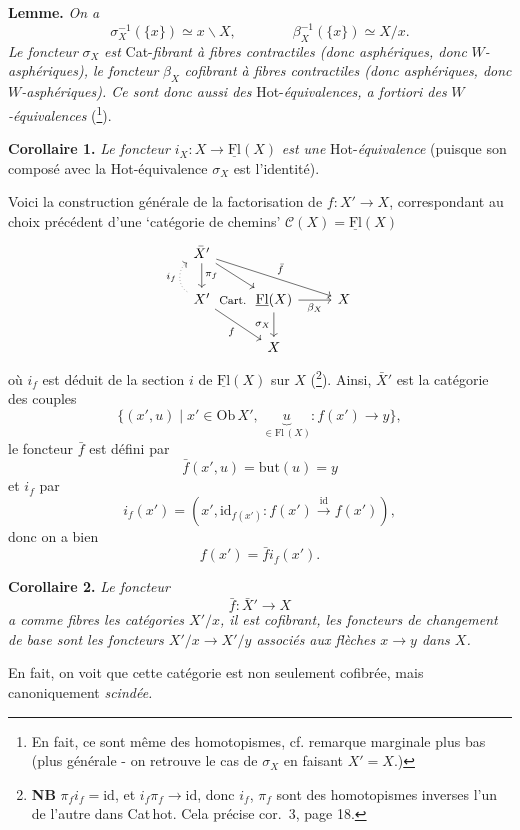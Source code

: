 \documentclass[11pt]{article}
\newcommand{\printedpage}[1]{\marginpar{\footnotesize p.~#1}}
\newcommand{\msp}[1]{\marginpar{\footnotesize [#1]}}
\newcommand{\cat}[1]{\underline{\mathrm{#1}}}
\begin{document}
\msp{page 17}
\textbf{Lemme.} \textit{On a}
\[
\sigma_X^{-1}(\{x\}) \simeq x\backslash X, \qquad\qquad \beta_X^{-1}(\{x\}) \simeq X/x.
\]
\textit{Le foncteur} $\sigma_X$ \textit{est} Cat-\textit{fibrant à fibres contractiles (donc asphériques, donc} $W$\textit{-asphériques), le foncteur} $\beta_X$ \textit{cofibrant à fibres contractiles (donc asphériques, donc} $W$\textit{-asphériques). Ce sont donc aussi des} Hot-\textit{équivalences, a fortiori des} $W$\textit{-équivalences} (\footnote[8]{En fait, ce sont même des homotopismes, cf. remarque marginale plus bas (plus générale - on retrouve le cas de $\sigma_X$ en faisant $X' = X$.)}).

\textbf{Corollaire 1.} \textit{Le foncteur} $i_X : X \longrightarrow \cat{Fl}(X)$ \textit{est une} Hot-\textit{équivalence} (puisque son composé avec la Hot-équivalence $\sigma_X$ est l'identité).

\printedpage{11}
Voici la construction générale de la factorisation de $f : X' \longrightarrow X$, correspondant au choix précédent d'une `catégorie de chemins' $\mathcal{C}(X) = \cat{Fl}(X)$
\[
\begin{tikzcd}
\bar{X}' \arrow[d, "\pi_f"] \arrow[rd] \arrow[rrd, "\bar{f}"] & & \\
X' \arrow[u, dotted, bend left=60, "i_f"] \arrow[rd, "f"'] \arrow[r, phantom, "\text{\footnotesize Cart.}"] & \cat{Fl}(X) \arrow[r, "\beta_X"'] \arrow[d, "\sigma_X"'] & X \\
& X &
\end{tikzcd}
\]
où $i_f$ est déduit de la section $i$ de $\cat{Fl}(X)$ sur $X$ (\footnote[9]{\textbf{NB} $\pi_f i_f = \mathrm{id}$, et $i_f\pi_f \longrightarrow \mathrm{id}$, donc $i_f$, $\pi_f$ sont des homotopismes inverses l'un de l'autre dans Cat\,hot. Cela précise cor.~3, page 18.}). Ainsi, $\bar{X}'$ est la catégorie des couples
\[
\{(x',u) \mid x' \in \mathrm{Ob}\,X',\ \underbrace{u}_{\in\mathrm{Fl}\,(X)} : f(x') \longrightarrow y\},
\]
le foncteur $\bar{f}$ est défini par
\[
\bar{f}(x',u) = \mathrm{but}(u) = y
\]
et $i_f$ par
\[
i_f(x') = (x', \mathrm{id}_{f(x')} : f(x') \xrightarrow{\mathrm{id}} f(x')),
\]
donc on a bien
\[
f(x') = \bar{f} i_f(x').
\]

\msp{page 18}
\textbf{Corollaire 2.} \textit{Le foncteur}
\[
\bar{f} : \bar{X}' \longrightarrow X
\]
\textit{a comme fibres les catégories $X'/x$, il est cofibrant, les foncteurs de changement de base sont les foncteurs $X'/x \longrightarrow X'/y$ associés aux flèches $x \longrightarrow y$ dans $X$.}

En fait, on voit que cette catégorie est non seulement cofibrée, mais canoniquement \textit{scindée.}
\end{document}
